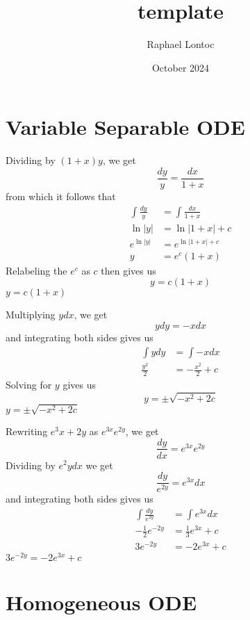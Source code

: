 \documentclass{report}
\title{template}
\author{Raphael Lontoc}
\date{October 2024}
\begin{document}
\maketitle

\chapter*{Variable Separable ODE}

\soln Dividing by $(1+x)y$, we get
\[
    \frac{dy}{y} = \frac{dx}{1+x}
\]
from which it follows that
\begin{align*}
    \int \frac{dy}{y} &= \int \frac{dx}{1+x} \\
    \ln|y| &= \ln|1+x| + c \\ 
    e^{\ln|y|} &= e^{\ln|1+x| + c} \\
    y &= e^c(1+x)
\end{align*}
Relabeling the $e^c$ as $c$ then gives us
\[
    y=c(1+x)
\]
\ans $y=c(1+x)$

\medskip

\soln Multiplying $y dx$, we get
\[
    y dy = -x dx
\]
and integrating both sides gives us
\begin{align*}
    \int y dy &= \int -x dx \\
    \frac{y^2}{2} &= -\frac{x^2}{2} + c
\end{align*}
Solving for $y$ gives us
\[
    y = \pm\sqrt{-x^2+2c}
\]
\ans $y = \pm\sqrt{-x^2+2c}$

\medskip

\soln Rewriting $e^3x+2y$ as $e^{3x}e^{2y}$, we get
\[
    \frac{dy}{dx} = e^{3x}e^{2y}
\]
Dividing by $e^2y dx$ we get
\[
    \frac{dy}{e^{2y}} = e^{3x}dx
\]
and integrating both sides gives us
\begin{align*}
    \int \frac{dy}{e^{2y}} &= \int e^{3x}dx \\
    -\frac{1}{2}e^{-2y} &= \frac{1}{3}e^{3x} + c \\
    3e^{-2y} &= -2e^{3x} + c
\end{align*}
\ans $3e^{-2y} = -2e^{3x} + c$

\pagebreak

\chapter*{Homogeneous ODE}



\prob{}{

}
\end{document}

